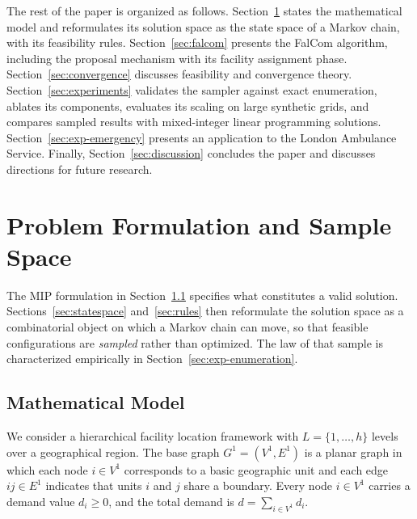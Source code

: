 \documentclass[11pt]{article}
\theoremstyle{definition}
\begin{document}
The rest of the paper is organized as follows.
Section~\ref{sec:graph} states the mathematical model and reformulates its solution space 
as the state space of a Markov chain, with its feasibility rules. 
Section~\ref{sec:falcom} presents the FalCom algorithm, including the proposal 
mechanism with its facility assignment phase. Section~\ref{sec:convergence} discusses 
feasibility and convergence theory. Section~\ref{sec:experiments} 
validates the sampler against exact enumeration, ablates its components, evaluates 
its scaling on large synthetic grids, and compares sampled results with mixed-integer 
linear programming solutions. Section~\ref{sec:exp-emergency} presents an application 
to the London Ambulance Service. Finally, Section~\ref{sec:discussion} 
concludes the paper and discusses directions for future research.



\section{Problem Formulation and Sample Space}
\label{sec:graph}

The MIP formulation in Section~\ref{sec:model} specifies what constitutes a
valid solution. Sections~\ref{sec:statespace} and~\ref{sec:rules} then reformulate the solution space as a combinatorial object on which a Markov chain can move, so that feasible configurations are \emph{sampled} rather than optimized. The law of that sample is characterized empirically in Section~\ref{sec:exp-enumeration}.

\subsection{Mathematical Model}
\label{sec:model}

We consider a hierarchical facility location framework with $L = \{1, \ldots, h\}$
levels over a geographical region. The base graph $G^1 = (V^1, E^1)$ is a planar
graph in which each node $i \in V^1$ corresponds to a basic geographic unit and
each edge $ij \in E^1$ indicates that units $i$ and $j$ share a boundary.
Every node $i \in V^1$ carries a demand value $d_i \geq 0$, and the total demand
is $d = \sum_{i \in V^1} d_i$.
\end{document}
